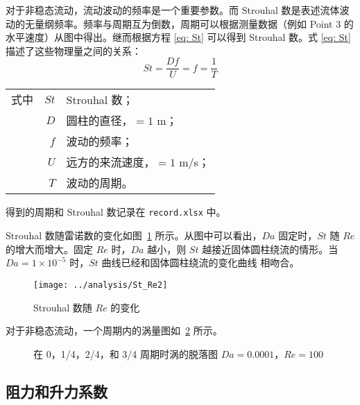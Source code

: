 对于非稳态流动，流动波动的频率是一个重要参数。而 Strouhal 数是表述流体波动的无量纲频率。频率与周期互为倒数，周期可以根据测量数据（例如 Point 3 的水平速度）从图中得出。继而根据方程 \eqref{eq: St} 可以得到 Strouhal 数。式 \eqref{eq: St} 描述了这些物理量之间的关系：
\begin{equation}\label{eq: St}
	St = \frac{Df}{U} = f = \frac{1}{T}
\end{equation}
\begin{tabularx}{\textwidth}{@{}l@{\quad}r@{——}X@{}}
	式中 & $St$ & Strouhal 数；\\
		& $D$ & 圆柱的直径，$=1$ m；\\
		& $f$ & 波动的频率；\\
		& $U$ & 远方的来流速度，$=1$ m/s；\\
		& $T$ & 波动的周期。 
\end{tabularx}\vspace{3.15bp}
得到的周期和 Strouhal 数记录在 \texttt{record.xlsx} 中。

Strouhal 数随雷诺数的变化如图~\ref{fig: St} 所示。从图中可以看出，$Da$ 固定时，$St$ 随 $Re$ 的增大而增大。固定 $Re$ 时，$Da$ 越小，则 $St$ 越接近固体圆柱绕流的情形。当 $Da=1 \times 10^{-5}$ 时，$St$ 曲线已经和固体圆柱绕流的变化曲线 \cite{} 相吻合。

\begin{figure}
	\centering
	\texttt{[image: ../analysis/St\_Re2]}
	\caption{Strouhal 数随 $Re$ 的变化}
	\label{fig: St}
\end{figure}

对于非稳态流动，一个周期内的涡量图如~\ref{fig: 4*vortex} 所示。

\begin{figure}
	\centering
	\begin{minipage}{\textwidth}
		\centering
	\end{minipage}
	\centering
	\begin{minipage}{\textwidth}
		\centering
	\end{minipage}
	\caption{在 0，1/4，2/4，和 3/4 周期时涡的脱落图 $Da=0.0001$，$Re=100$}
	\label{fig: 4*vortex}
\end{figure}

\subsection{阻力和升力系数}

